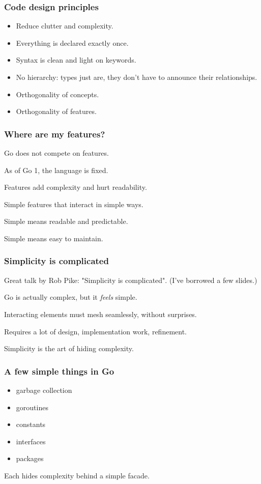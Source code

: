 \documentclass[9pt]{beamer}
\begin{document}
\begin{frame}[fragile]
\frametitle{Code design principles}


\begin{itemize}
\item Reduce clutter and complexity.
\item Everything is declared exactly once.
\item Syntax is clean and light on keywords.
\item No hierarchy: types just are, they don't have to announce their relationships.
\item Orthogonality of concepts.
\item Orthogonality of features.
\end{itemize}


\end{frame}

\begin{frame}[fragile]
\frametitle{Where are my features?}


Go does not compete on features.


As of Go 1, the language is fixed.


Features add complexity and hurt readability.


Simple features that interact in simple ways.


Simple means readable and predictable.


Simple means easy to maintain.



\end{frame}

\begin{frame}[fragile]
\frametitle{Simplicity is complicated}


Great talk by Rob Pike: "Simplicity is complicated". (I've borrowed a few slides.)


Go is actually complex, but it \emph{feels} simple.


Interacting elements must mesh seamlessly, without surprises.


Requires a lot of design, implementation work, refinement.


Simplicity is the art of hiding complexity.



\end{frame}

\begin{frame}[fragile]
\frametitle{A few simple things in Go}


\begin{itemize}
\item garbage collection
\item goroutines
\item constants
\item interfaces
\item packages
\end{itemize}

Each hides complexity behind a simple facade.



\end{frame}
\end{document}

